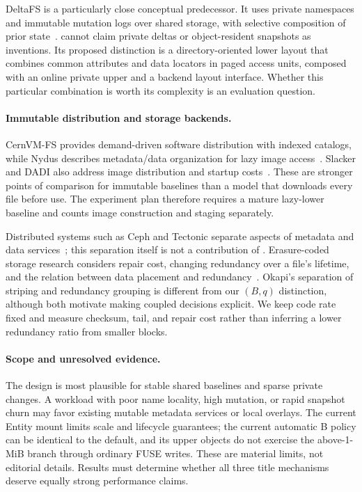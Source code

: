 DeltaFS is a particularly close conceptual predecessor. It uses private
namespaces and immutable mutation logs over shared storage, with selective
composition of prior state~\cite{deltafs2021}. \sys cannot claim private
deltas or object-resident snapshots as inventions. Its proposed distinction
is a directory-oriented lower layout that combines common attributes and
data locators in paged access units, composed with an online private upper
and a backend layout interface. Whether this particular combination is
worth its complexity is an evaluation question.

\paragraph{Immutable distribution and storage backends.}
CernVM-FS provides demand-driven software distribution with indexed
catalogs, while Nydus describes metadata/data organization for lazy
image access~\cite{cvmfs2011,nydus_rafs}. Slacker and DADI also address
image distribution and startup costs~\cite{slacker2016,dadi2020}.
These are stronger points of comparison for immutable baselines than a
model that downloads every file before use. The experiment plan therefore
requires a mature lazy-lower baseline and counts image construction and
staging separately.

Distributed systems such as Ceph and Tectonic separate aspects of metadata
and data services~\cite{ceph2006,tectonic2021}; this separation itself is not
a contribution of \sysname. Erasure-coded storage research considers
repair cost, changing redundancy over a file's lifetime, and the relation
between data placement and redundancy~\cite{azureec2012,morph2024,okapi2025}.
Okapi's separation of striping and redundancy grouping is different from
our $(B,q)$ distinction, although both motivate making coupled decisions
explicit. We keep code rate fixed and measure checksum, tail, and repair
cost rather than inferring a lower redundancy ratio from smaller blocks.

\paragraph{Scope and unresolved evidence.}
The design is most plausible for stable shared baselines and sparse private
changes. A workload with poor name locality, high mutation, or rapid
snapshot churn may favor existing mutable metadata services or local
overlays. The current Entity mount limits scale and lifecycle guarantees;
the current automatic B policy can be identical to the default, and its
upper objects do not exercise the above-1-MiB branch through ordinary
FUSE writes. These are material limits, not editorial details. Results
must determine whether all three title mechanisms deserve equally strong
performance claims.
